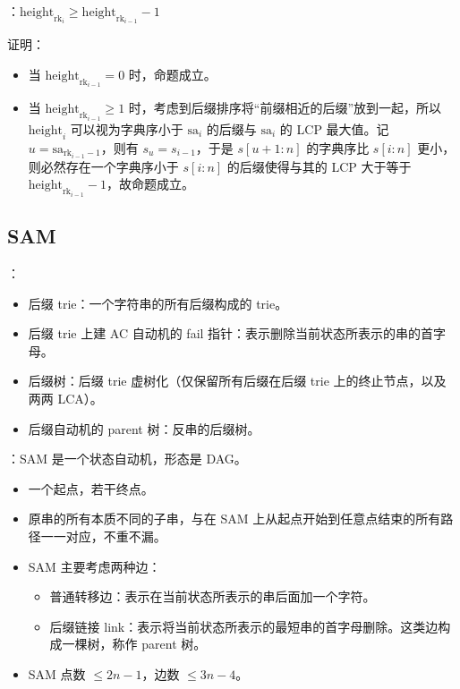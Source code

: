 ：$\mathrm{height}_{\mathrm{rk}_i} \geq \mathrm{height}_{\mathrm{rk}_{i - 1}} - 1$

证明：

\begin{itemize}
    \item 当 $\mathrm{height}_{\mathrm{rk}_{i - 1}} = 0$ 时，命题成立。
    \item 当 $\mathrm{height}_{\mathrm{rk}_{i - 1}} \geq 1$ 时，考虑到后缀排序将“前缀相近的后缀”放到一起，所以 $\mathrm{height}_i$ 可以视为字典序小于 $\mathrm{sa}_i$ 的后缀与 $\mathrm{sa}_i$ 的 LCP 最大值。记 $u = \mathrm{sa}_{\mathrm{rk}_{i - 1} - 1}$，则有 $s_u = s_{i - 1}$，于是 $s[u + 1 : n]$ 的字典序比 $s[i : n]$ 更小，则必然存在一个字典序小于 $s[i : n]$ 的后缀使得与其的 LCP 大于等于 $\mathrm{height}_{\mathrm{rk}_{i - 1}} - 1$，故命题成立。
\end{itemize}


\subsection{SAM}

：

\begin{itemize}
    \item 后缀 trie：一个字符串的所有后缀构成的 trie。
    \item 后缀 trie 上建 AC 自动机的 fail 指针：表示删除当前状态所表示的串的首字母。
    \item 后缀树：后缀 trie 虚树化（仅保留所有后缀在后缀 trie 上的终止节点，以及两两 LCA）。
    \item 后缀自动机的 parent 树：反串的后缀树。
\end{itemize}

：SAM 是一个状态自动机，形态是 DAG。

\begin{itemize}
    \item 一个起点，若干终点。
    \item 原串的所有本质不同的子串，与在 SAM 上从起点开始到任意点结束的所有路径一一对应，不重不漏。
    \item SAM 主要考虑两种边：
    \begin{itemize}
        \item 普通转移边：表示在当前状态所表示的串后面加一个字符。
        \item 后缀链接 link：表示将当前状态所表示的最短串的首字母删除。这类边构成一棵树，称作 parent 树。
    \end{itemize}
    \item SAM 点数 $\leq 2n - 1$，边数 $\leq 3n - 4$。
\end{itemize}

